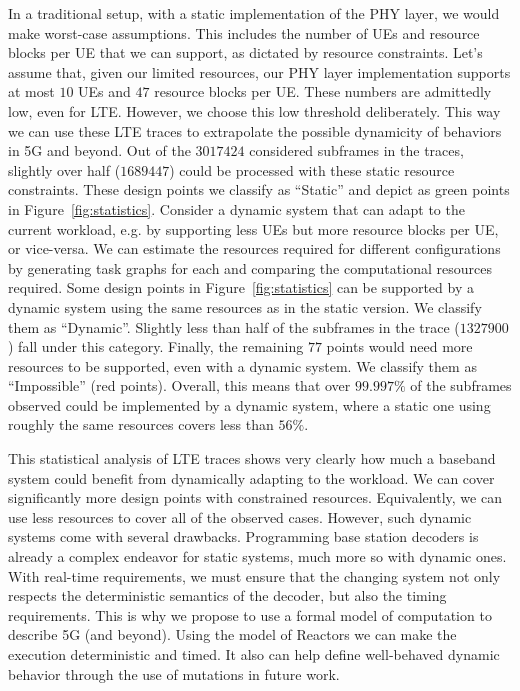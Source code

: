 In a traditional setup, with a static implementation of the PHY layer, we would make worst-case assumptions.
This includes the number of UEs and resource blocks per UE that we can support, as dictated by resource constraints.
Let's assume that, given our limited resources, our PHY layer implementation supports at most $10$ UEs and $47$ resource blocks per UE.
These numbers are admittedly low, even for LTE.
However, we choose this low threshold deliberately.
This way we can use these LTE traces to extrapolate the possible dynamicity of behaviors in 5G and beyond.
Out of the $3017424$ considered subframes in the traces, slightly over half ($1689447$) could be processed with these static resource constraints.
These design points we classify as ``Static'' and depict as green points in Figure~\ref{fig:statistics}.
Consider a dynamic system that can adapt to the current workload, e.g. by supporting less UEs but more resource blocks per UE, or vice-versa.
We can estimate the resources required for different configurations by generating task graphs for each and comparing the computational resources required.
Some design points in Figure~\ref{fig:statistics} can be supported by a dynamic system using the same resources as in the static version.
We classify them as ``Dynamic''.
Slightly less than half of the subframes in the trace ($1327900$) fall under this category.
Finally, the remaining $77$ points would need more resources to be supported, even with a dynamic system.
We classify them as ``Impossible'' (red points).
Overall, this means that over $99.997\%$ of the subframes observed could be implemented by a dynamic system, where a static one using roughly the same resources covers less than $56\%$.

This statistical analysis of LTE traces shows very clearly how much a baseband system could benefit from dynamically adapting to the workload.
We can cover significantly more design points with constrained resources. Equivalently, we can use less resources to cover all of the observed cases.
However, such dynamic systems come with several drawbacks.
Programming base station decoders is already a complex endeavor for static systems, much more so with dynamic ones.
With real-time requirements, we must ensure that the changing system not only respects the deterministic semantics of the decoder, but also the timing requirements.
This is why we propose to use a formal model of computation to describe 5G (and beyond). Using the model of Reactors we can make the execution deterministic and timed.
It also can help define well-behaved dynamic behavior through the use of mutations in future work.

